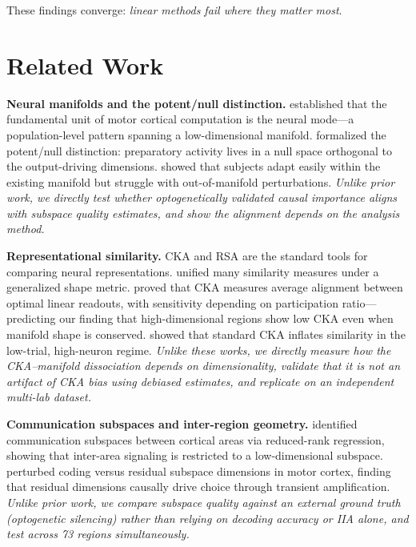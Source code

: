 \documentclass{article}
\begin{document}
These findings converge: \emph{linear methods fail where they matter most}.


\section{Related Work}

\textbf{Neural manifolds and the potent/null distinction.}
\citet{gallego2017neural} established that the fundamental unit of motor cortical computation is the neural mode---a population-level pattern spanning a low-dimensional manifold.
\citet{kaufman2014cortical} formalized the potent/null distinction: preparatory activity lives in a null space orthogonal to the output-driving dimensions.
\citet{sadtler2014neural} showed that subjects adapt easily within the existing manifold but struggle with out-of-manifold perturbations.
\emph{Unlike prior work, we directly test whether optogenetically validated causal importance aligns with subspace quality estimates, and show the alignment depends on the analysis method.}

\textbf{Representational similarity.}
CKA \citep{kornblith2019similarity} and RSA \citep{kriegeskorte2008representational} are the standard tools for comparing neural representations.
\citet{williams2021generalized} unified many similarity measures under a generalized shape metric.
\citet{harvey2024representational} proved that CKA measures average alignment between optimal linear readouts, with sensitivity depending on participation ratio---predicting our finding that high-dimensional regions show low CKA even when manifold shape is conserved.
\citet{murphy2024biased} showed that standard CKA inflates similarity in the low-trial, high-neuron regime.
\emph{Unlike these works, we directly measure how the CKA--manifold dissociation depends on dimensionality, validate that it is not an artifact of CKA bias using debiased estimates, and replicate on an independent multi-lab dataset.}

\textbf{Communication subspaces and inter-region geometry.}
\citet{semedo2019cortical} identified communication subspaces between cortical areas via reduced-rank regression, showing that inter-area signaling is restricted to a low-dimensional subspace.
\citet{pereira2025residual} perturbed coding versus residual subspace dimensions in motor cortex, finding that residual dimensions causally drive choice through transient amplification.
\emph{Unlike prior work, we compare subspace quality against an external ground truth (optogenetic silencing) rather than relying on decoding accuracy or IIA alone, and test across 73 regions simultaneously.}
\end{document}
